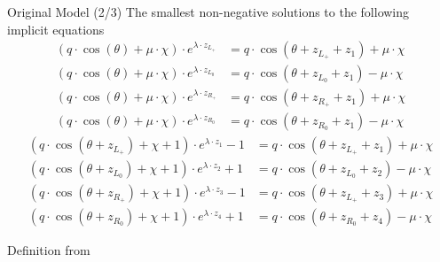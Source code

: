 \begin{frame}{Original Model (2/3)}
	\vspace{-1em}
	The smallest non-negative solutions to the following implicit equations
	\begin{subequations}
		\begin{align}
			(q \cdot \cos(\theta) + \mu \cdot \chi) \cdot e^{\lambda \cdot z_{L_+}}
			 & = q \cdot \cos(\theta + z_{L_+} + z_1) + \mu \cdot \chi \\
			(q \cdot \cos(\theta) + \mu \cdot \chi) \cdot e^{\lambda \cdot z_{L_0}}
			 & = q \cdot \cos(\theta + z_{L_0} + z_1) - \mu \cdot \chi \\
			(q \cdot \cos(\theta) + \mu \cdot \chi) \cdot e^{\lambda \cdot z_{R_+}}
			 & = q \cdot \cos(\theta + z_{R_+} + z_1) + \mu \cdot \chi \\
			(q \cdot \cos(\theta) + \mu \cdot \chi) \cdot e^{\lambda \cdot z_{R_0}}
			 & = q \cdot \cos(\theta + z_{R_0} + z_1) - \mu \cdot \chi
		\end{align}
	\end{subequations}
	\vspace{-2em}
	\begin{subequations}
		\begin{align}
			(q \cdot \cos(\theta + z_{L_+}) + \chi + 1) \cdot e^{\lambda \cdot z_1} - 1
			 & = q \cdot  \cos(\theta + z_{L_+} + z_1) + \mu \cdot \chi \\
			(q \cdot \cos(\theta + z_{L_0}) + \chi + 1) \cdot e^{\lambda \cdot z_2} + 1
			 & = q \cdot  \cos(\theta + z_{L_0} + z_2) - \mu \cdot \chi \\
			(q \cdot \cos(\theta + z_{R_+}) + \chi + 1) \cdot e^{\lambda \cdot z_3} - 1
			 & = q \cdot  \cos(\theta + z_{L_+} + z_3) + \mu \cdot \chi \\
			(q \cdot \cos(\theta + z_{R_0}) + \chi + 1) \cdot e^{\lambda \cdot z_4} + 1
			 & = q \cdot  \cos(\theta + z_{R_0} + z_4) - \mu \cdot \chi
		\end{align}
	\end{subequations}
	\begin{flushright}
		Definition from \cite{akyuz2022}
	\end{flushright}
\end{frame}

